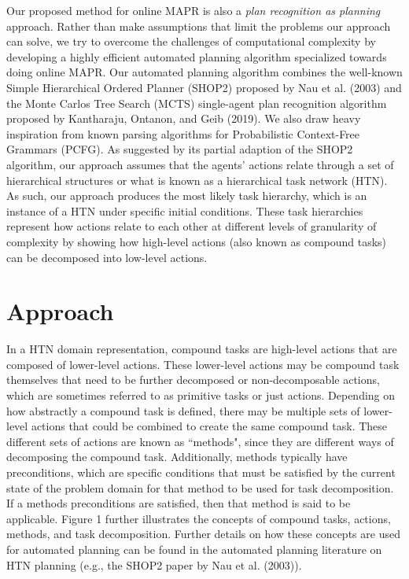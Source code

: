 Our proposed method for online MAPR is also a \textit{plan recognition as planning} approach. Rather than make assumptions that limit the problems our approach can solve, we try to overcome the challenges of computational complexity by developing a highly efficient automated planning algorithm specialized towards doing online MAPR. Our automated planning algorithm combines the well-known Simple Hierarchical Ordered Planner (SHOP2) proposed by Nau et al. (2003) and the Monte Carlos Tree Search (MCTS) single-agent plan recognition algorithm proposed by Kantharaju, Ontanon, and Geib (2019). We also draw heavy inspiration from known parsing algorithms for Probabilistic Context-Free Grammars (PCFG). As suggested by its partial adaption of the SHOP2 algorithm, our approach assumes that the agents' actions relate through a set of hierarchical structures or what is known as a hierarchical task network (HTN). As such, our approach produces the most likely task hierarchy, which is an instance of a HTN under specific initial conditions. These task hierarchies represent how actions relate to each other at different levels of granularity of complexity by showing how high-level actions (also known as compound tasks) can be decomposed into low-level actions. 

\section{Approach}
In a HTN domain representation, compound tasks are high-level actions that are composed of lower-level actions. These lower-level actions may be compound task themselves that need to be further decomposed or non-decomposable actions, which are sometimes referred to as primitive tasks or just actions. Depending on how abstractly a compound task is defined, there may be multiple sets of lower-level actions that could be combined to create the same compound task. These different sets of actions are known as ``methods", since they are different ways of decomposing the compound task. Additionally, methods typically have preconditions, which are specific conditions that must be satisfied by the current state of the problem domain for that method to be used for task decomposition. If a methods preconditions are satisfied, then that method is said to be applicable. Figure 1 further illustrates the concepts of compound tasks, actions, methods, and task decomposition. Further details on how these concepts are used for automated planning can be found in the automated planning literature on HTN planning (e.g., the SHOP2 paper by Nau et al. (2003)). 

